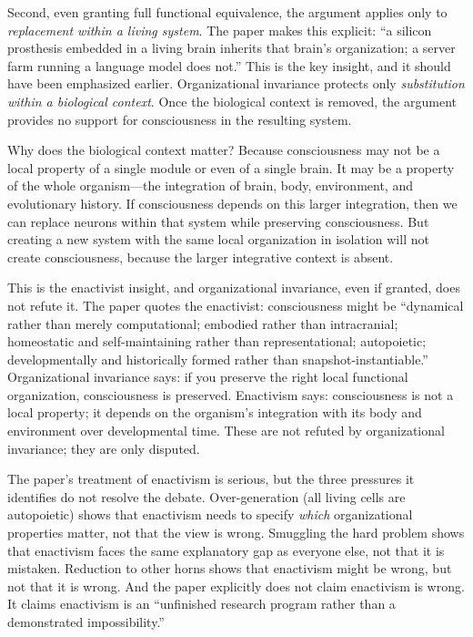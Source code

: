 \documentclass[11pt]{article}
\begin{document}
Second, even granting full functional equivalence, the argument applies only to \textit{replacement within a living system}. The paper makes this explicit: ``a silicon prosthesis embedded in a living brain inherits that brain's organization; a server farm running a language model does not.'' This is the key insight, and it should have been emphasized earlier. Organizational invariance protects only \textit{substitution within a biological context}. Once the biological context is removed, the argument provides no support for consciousness in the resulting system.

Why does the biological context matter? Because consciousness may not be a local property of a single module or even of a single brain. It may be a property of the whole organism---the integration of brain, body, environment, and evolutionary history. If consciousness depends on this larger integration, then we can replace neurons within that system while preserving consciousness. But creating a new system with the same local organization in isolation will not create consciousness, because the larger integrative context is absent.

This is the enactivist insight, and organizational invariance, even if granted, does not refute it. The paper quotes the enactivist: consciousness might be ``dynamical rather than merely computational; embodied rather than intracranial; homeostatic and self-maintaining rather than representational; autopoietic; developmentally and historically formed rather than snapshot-instantiable.'' Organizational invariance says: if you preserve the right local functional organization, consciousness is preserved. Enactivism says: consciousness is not a local property; it depends on the organism's integration with its body and environment over developmental time. These are not refuted by organizational invariance; they are only disputed.

The paper's treatment of enactivism is serious, but the three pressures it identifies do not resolve the debate. Over-generation (all living cells are autopoietic) shows that enactivism needs to specify \textit{which} organizational properties matter, not that the view is wrong. Smuggling the hard problem shows that enactivism faces the same explanatory gap as everyone else, not that it is mistaken. Reduction to other horns shows that enactivism might be wrong, but not that it is wrong. And the paper explicitly does not claim enactivism is wrong. It claims enactivism is an ``unfinished research program rather than a demonstrated impossibility.''
\end{document}
